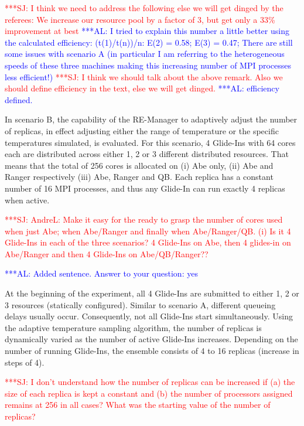 \documentclass{rspublic}
\newcommand{\alnote}[1]{ {\textcolor{blue} { ***AL: #1 }}}
\newcommand{\jhanote}[1]{ {\textcolor{red} { ***SJ: #1 }}}
\newcommand{\alnote}[1]{}
\newcommand{\jhanote}[1]{}
\begin{document}
\jhanote{I think we need to address
  the following else we will get dinged by the referees: We increase
  our resource pool by a factor of 3, but get only a 33\% improvement
  at best} \alnote{I tried to explain this number a little better
  using the calculated efficiency: (t(1)/t(n))/n: E(2) = 0.58; E(3) =
  0.47; There are still some issues with scenario A (in particular I
  am referring to the heterogeneous speeds of these three machines
  making this increasing number of MPI processes less efficient!)}
\jhanote{I think we should talk about the above remark. Also we should
  define efficiency in the text, else we will get dinged.}  
\alnote{efficiency defined.}

In scenario B, the capability of the RE-Manager to adaptively adjust
the number of replicas, in effect adjusting either the
range of temperature or the specific temperatures simulated, is
evaluated.  For this scenario, 4 Glide-Ins with 64 cores each
are distributed across either 1, 2 or 3 different distributed
resources. That means that the total of 256 cores is allocated on (i)
Abe only, (ii) Abe and Ranger respectively (iii) Abe, Ranger and QB.
Each replica has a constant number of 16 MPI processes, and thus any
Glide-In can run exactly 4 replicas when active.

\jhanote{AndreL: Make it easy for the ready to grasp the number of
  cores used when just Abe; when Abe/Ranger and finally when
  Abe/Ranger/QB. (i) Is it 4 Glide-Ins in each of the three scenarios?
  4 Glide-Ins on Abe, then 4 glides-in on Abe/Ranger and then 4
  Glide-Ins on Abe/QB/Ranger??}

\alnote{Added sentence. Answer to your question: yes}
              
At the beginning of the experiment, all 4 Glide-Ins are submitted to
either 1, 2 or 3 resources (statically configured).  Similar to
scenario A, different queueing delays usually occur.
Consequently, not all Glide-Ins start
simultaneously.  Using the adaptive temperature sampling algorithm,
the number of replicas is dynamically varied as the number of active
Glide-Ins increases. Depending on the number of running Glide-Ins, the
ensemble consists of 4 to 16 replicas (increase in
steps of 4).

\jhanote{I don't understand how the number of replicas can be
  increased if (a) the size of each replica is kept a constant and (b)
  the number of processors assigned remains at 256 in all cases? What
  was the starting value of the number of replicas?}  
\end{document}
